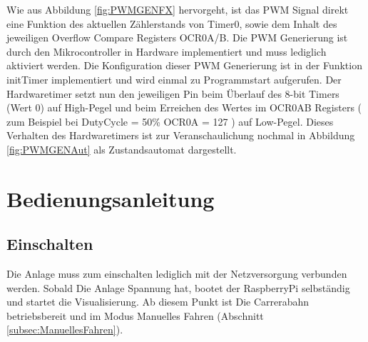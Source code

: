 \documentclass[a4paper, 11pt]{report}
\begin{document}
Wie aus Abbildung \ref{fig:PWMGENFX} hervorgeht, ist das PWM Signal direkt eine Funktion des aktuellen Zählerstands von Timer0, sowie dem Inhalt des jeweiligen Overflow Compare Registers OCR0A/B.
Die PWM Generierung ist durch den Mikrocontroller in Hardware implementiert und muss lediglich aktiviert werden. Die Konfiguration dieser PWM Generierung ist in der Funktion initTimer implementiert und wird einmal zu Programmstart aufgerufen. Der Hardwaretimer setzt nun den jeweiligen Pin beim Überlauf des 8-bit Timers (Wert 0) auf High-Pegel und beim Erreichen des Wertes im OCR0AB Registers ( zum Beispiel  bei DutyCycle = 50\% OCR0A = 127 ) auf Low-Pegel.
Dieses Verhalten des Hardwaretimers ist zur Veranschaulichung nochmal in Abbildung  \ref{fig:PWMGENAut} als Zustandsautomat dargestellt.


\chapter{Bedienungsanleitung}
\section{Einschalten}
	Die Anlage muss zum einschalten lediglich mit der Netzversorgung verbunden werden. Sobald Die Anlage Spannung hat, bootet der RaspberryPi selbständig und startet die Visualisierung. Ab diesem Punkt ist Die Carrerabahn betriebsbereit und im Modus Manuelles Fahren (Abschnitt \ref{subsec:ManuellesFahren}).
\end{document}
